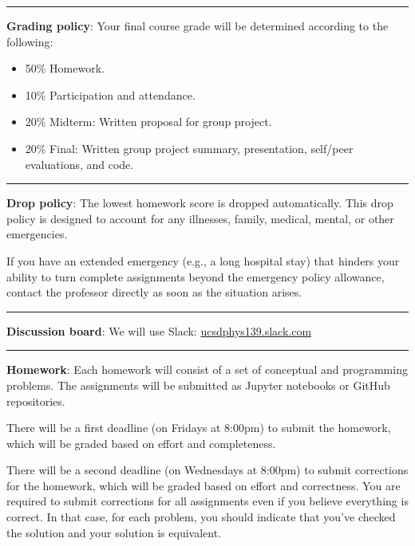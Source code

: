 \documentclass[12pt]{article}
\begin{document}
\begin{center}
	\rule{\textwidth}{0.5pt}
\end{center}

\noindent\textbf{Grading policy}: Your final course grade will be determined according to the following:
\begin{itemize}
	\itemsep-0.3em
	\item 50\% Homework.
	\item 10\% Participation and attendance.
	\item 20\% Midterm: Written proposal for group project.
	\item 20\% Final: Written group project summary, presentation, self/peer evaluations, and code.
\end{itemize}

\begin{center}
	\rule{\textwidth}{0.5pt}
\end{center}

\noindent\textbf{Drop policy}: The lowest homework score is dropped automatically.
This drop policy is designed to account for any illnesses, family, medical, mental, or other emergencies.

If you have an extended emergency (e.g., a long hospital stay) that hinders your ability to turn complete assignments beyond the emergency policy allowance, contact the professor directly as soon as the situation arises.

\begin{center}
	\rule{\textwidth}{0.5pt}
\end{center}

\noindent\textbf{Discussion board}: We will use Slack: \href{https://join.slack.com/t/ucsdphys139/shared\_invite/zt-110gwd4lx-pZBsItfcxhbOD5BV6afVDA}{ucsdphys139.slack.com}

\begin{center}
	\rule{\textwidth}{0.5pt}
\end{center}

\noindent\textbf{Homework}: Each homework will consist of a set of conceptual and programming problems.
The assignments will be submitted as Jupyter notebooks or GitHub repositories.

There will be a first deadline (on Fridays at 8:00pm) to submit the homework, which will be graded based on effort and completeness.

There will be a second deadline (on Wednesdays at 8:00pm) to submit corrections for the homework, which will be graded based on effort and correctness.
You are required to submit corrections for all assignments even if you believe everything is correct.
In that case, for each problem, you should indicate that you've checked the solution and your solution is equivalent.
\end{document}
